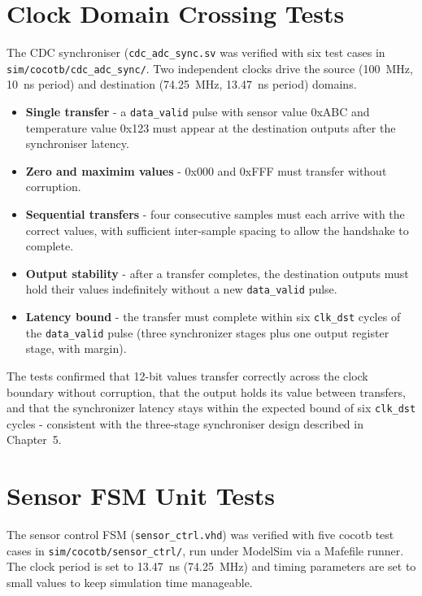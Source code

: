 \section{Clock Domain Crossing Tests}

The CDC synchroniser (\texttt{cdc\_adc\_sync.sv} was verified with six test cases in \texttt{sim/cocotb/cdc\_adc\_sync/}. Two independent clocks drive the source (100~MHz, 10~ns period) and destination (74.25~MHz, 13.47~ns period) domains.

\begin{itemize}
    \item \textbf{Single transfer} - a \texttt{data\_valid} pulse with sensor value 0xABC and temperature value 0x123 must appear at the destination outputs after the synchroniser latency.
    \item \textbf{Zero and maximim values} - 0x000 and 0xFFF must transfer without corruption.
    \item \textbf{Sequential transfers} - four consecutive samples must each arrive with the correct values, with sufficient inter-sample spacing to allow the handshake to complete.
    \item \textbf{Output stability} - after a transfer completes, the destination outputs must hold their values indefinitely without a new \texttt{data\_valid} pulse.
    \item \textbf{Latency bound} - the transfer must complete within six \texttt{clk\_dst} cycles of the \texttt{data\_valid} pulse (three synchronizer stages plus one output register stage, with margin).
\end{itemize}

The tests confirmed that 12-bit values transfer correctly across the clock boundary without corruption, that the output holds its value between transfers, and that the synchronizer latency stays within the expected bound of six \texttt{clk\_dst} cycles - consistent with the three-stage synchroniser design described in Chapter~5.


\section{Sensor FSM Unit Tests}

The sensor control FSM (\texttt{sensor\_ctrl.vhd}) was verified with five cocotb test cases in \texttt{sim/cocotb/sensor\_ctrl/}, run under ModelSim via a Mafefile runner. The clock period is set to 13.47~ns (74.25~MHz) and timing parameters are set to small values to keep simulation time manageable.

